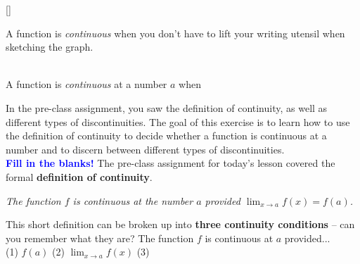 \documentclass[10pt]{article}
\begin{document}
[]{
\begin{center}{\bf {}} \end{center}
A function is {\em continuous} when you don't have to lift your writing utensil when sketching the graph.
~\\
{\bf{}}
}{
\begin{center}\\
A function is {\em continuous} at a number $a$  when \\
\centering {}\end{center}
}
\newpage
In the pre-class assignment, you saw the definition of continuity, as well as different types of discontinuities. The goal of this exercise is to learn how to use the definition of continuity to decide whether a function is continuous at a number and to discern between different types of discontinuities.\\

{\bf \textcolor{blue}{Fill in the blanks!}} The pre-class assignment for today's lesson covered the formal {\bf definition of continuity}. 
\begin{center}
{\it The function $f$ is continuous at the number $a$ provided $\displaystyle\lim_{x\to a} f(x)=f(a)$.} \\ %
\end{center}

\bigskip

This short definition can be broken up into {\bf three continuity conditions} -- can you remember what they are? The function $f$ is continuous at $a$ provided...  \\
(1) $f(a)$   \hfill
%
(2) $\displaystyle\lim_{x\to a}f(x)$ \hfill
%
(3)  \\[0.3in]
\end{document}

